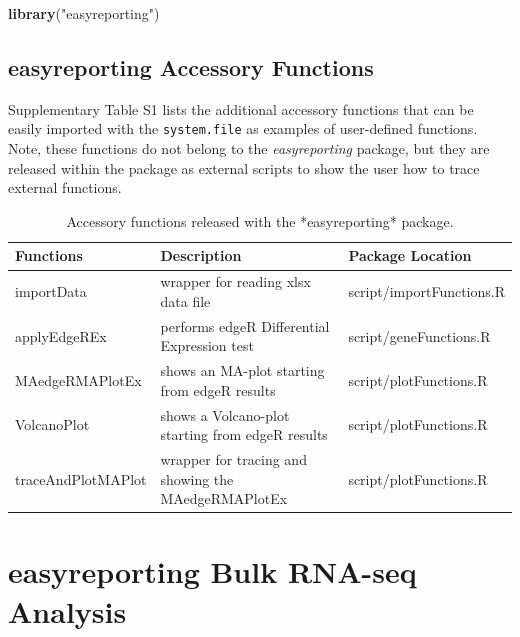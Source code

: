 \documentclass[]{article}
\newenvironment{Shaded}{\begin{snugshade}}{\end{snugshade}}
\newcommand{\KeywordTok}[1]{\textcolor[rgb]{0.13,0.29,0.53}{\textbf{#1}}}
\newcommand{\NormalTok}[1]{#1}
\newcommand{\StringTok}[1]{\textcolor[rgb]{0.31,0.60,0.02}{#1}}
\begin{document}
\begin{Shaded}
\begin{Highlighting}[]
\KeywordTok{library}\NormalTok{(}\StringTok{"easyreporting"}\NormalTok{) }
\end{Highlighting}
\end{Shaded}

%
        \setcounter{table}{0}
        \renewcommand{\thetable}{S\arabic{table}}%
        \setcounter{figure}{0}
        \renewcommand{\thefigure}{S\arabic{figure}}%

\hypertarget{easyreporting-accessory-functions}{%
\subsection{easyreporting Accessory
Functions}\label{easyreporting-accessory-functions}}

Supplementary Table S1 lists the additional accessory functions that can
be easily imported with the \texttt{system.file} as examples of
user-defined functions. Note, these functions do not belong to the
\emph{easyreporting} package, but they are released within the package
as external scripts to show the user how to trace external functions.

\begin{table}
\begin{tabular}{l|l|l}
\hline
\textbf{Functions} & \textbf{Description} & \textbf{Package Location} \\ \hline
importData & wrapper for reading xlsx data file & script/importFunctions.R \\
applyEdgeREx & performs edgeR Differential Expression test & script/geneFunctions.R \\ 
MAedgeRMAPlotEx & shows an MA-plot starting from edgeR results & script/plotFunctions.R \\ 
VolcanoPlot & shows a Volcano-plot starting from edgeR results & script/plotFunctions.R \\ 
traceAndPlotMAPlot & wrapper for tracing and showing the MAedgeRMAPlotEx & script/plotFunctions.R \\ \hline

\end{tabular}
\caption{Accessory functions released with the *easyreporting* package.}
\end{table}

\hypertarget{easyreporting-bulk-rna-seq-analysis}{%
\section{easyreporting Bulk RNA-seq
Analysis}\label{easyreporting-bulk-rna-seq-analysis}}
\end{document}
